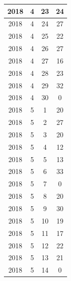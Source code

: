 \begin{longtable} {|c|c|c|c|}
\hline
2018         & 4            & 23           & 24                        \\ 
\hline
2018         & 4            & 24           & 27                        \\ 
\hline
2018         & 4            & 25           & 22                        \\ 
\hline
2018         & 4            & 26           & 27                        \\ 
\hline
2018         & 4            & 27           & 16                        \\ 
\hline
2018         & 4            & 28           & 23                        \\ 
\hline
2018         & 4            & 29           & 32                        \\ 
\hline
2018         & 4            & 30           & 0                         \\ 
\hline
2018         & 5            & 1            & 20                        \\ 
\hline
2018         & 5            & 2            & 27                        \\ 
\hline
2018         & 5            & 3            & 20                        \\ 
\hline
2018         & 5            & 4            & 12                        \\ 
\hline
2018         & 5            & 5            & 13                        \\ 
\hline
2018         & 5            & 6            & 33                        \\ 
\hline
2018         & 5            & 7            & 0                         \\ 
\hline
2018         & 5            & 8            & 20                        \\ 
\hline
2018         & 5            & 9            & 30                        \\ 
\hline
2018         & 5            & 10           & 19                        \\ 
\hline
2018         & 5            & 11           & 17                        \\ 
\hline
2018         & 5            & 12           & 22                        \\ 
\hline
2018         & 5            & 13           & 21                        \\ 
\hline
2018         & 5            & 14           & 0                         \\ 

\end{longtable}
